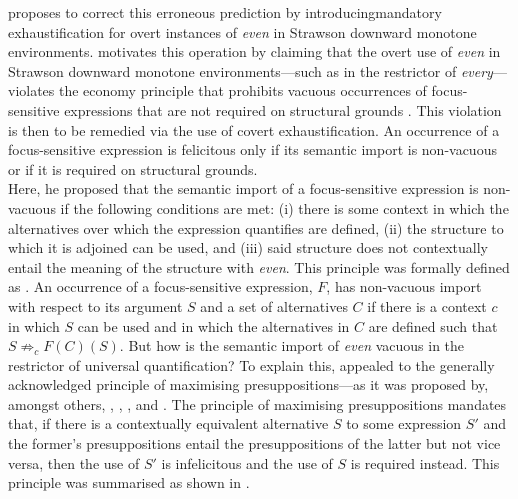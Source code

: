 \textcite{Crnic2014-dogma,Crnic2014-nm} proposes to correct this erroneous prediction by introducing\linebreak mandatory exhaustification for overt instances of \textit{even} in Strawson downward monotone environments. \textcite{Crnic2014-dogma,Crnic2014-nm} motivates this operation by claiming that the overt use of \textit{even} in Strawson downward monotone environments---such as in the restrictor of \textit{every}---violates the economy principle that prohibits vacuous occurrences of focus-sensitive expressions that are not required on structural grounds \parencite{Crnic2011-meaning,Spector2013}. This violation is then to be remedied via the use of covert exhaustification.
\ex
{}
An occurrence of a focus-sensitive expression is felicitous only if its semantic import is non-vacuous or if it is required on structural grounds.\\\emptyfill\parencite[p.~133]{Crnic2014-dogma}
\xe
Here, he proposed that the semantic import of a focus-sensitive expression is non-vacuous if the following conditions are met: (i) there is some context in which the alternatives over which the expression quantifies are defined, (ii) the structure to which it is adjoined can be used, and (iii) said structure does not contextually entail the meaning of the structure with \textit{even}. This principle was formally defined as .
\ex
{}
An occurrence of a focus-sensitive expression, $F$, has non-vacuous import with respect to
its argument $S$ and a set of alternatives $C$ if there is a context $c$ in which $S$ can be used and
in which the alternatives in $C$ are defined such that $S\not\Rightarrow_c F(C)(S)$.\hfill\parencite[p.~134]{Crnic2014-dogma}
\xe
But how is the semantic import of \textit{even} vacuous in the restrictor of universal quantification? To explain this, \textcite{Crnic2014-dogma} appealed to the generally acknowledged principle of maximising presuppositions---as it was proposed by, amongst others, \textcite{Heim1991}, \textcite{Percus2006}, \textcite{Sauerland2006}, and \textcite{Singh2011}. The principle of maximising presuppositions mandates that, if there is a contextually equivalent alternative $S$ to some expression $S'$ and the former's presuppositions entail the presuppositions of the latter but not vice versa, then the use of $S'$ is infelicitous and the use of $S$ is required instead. This principle was summarised as shown in .
\ex
